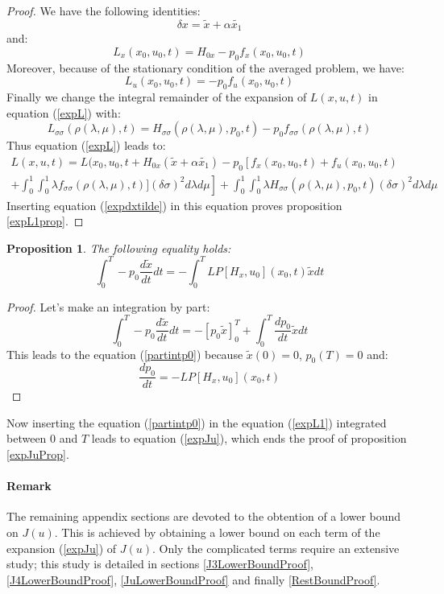 \documentclass[a4paper,10pt]{article}
\newtheorem{proposition}{Proposition}
\begin{document}
\begin{proof}
    We have the following identities:
    \[
        \delta x = \tilde{x} + \alpha \tilde{x_{1}}
    \]
    and:
    \[
      	L_{x}(x_{0},u_{0},t)= H_{0x} - p_{0} f_{x}(x_{0},u_{0},t) 
    \]
    Moreover, because of the stationary condition of the averaged 
    problem, we have:
    \[
      	L_{u}(x_{0},u_{0},t) =  - p_{0} f_{u}(x_{0},u_{0},t) 
    \]
    Finally we change the integral remainder of the expansion of 
    $L(x,u,t)$ in equation (\ref{expL}) with:
    \[
        L_{\sigma \sigma}(\rho(\lambda,\mu),t) 
	= H_{\sigma \sigma}(\rho(\lambda,\mu),p_{0},t)  
	  - p_{0} f_{\sigma \sigma}(\rho(\lambda,\mu),t)
    \]
    Thus equation (\ref{expL}) leads to:
    \begin{align*}
        L(x,u,t) = L(x_{0},u_{0},t + H_{0x} (\tilde{x} +\alpha \tilde{x_{1}}) 
	           - p_{0} \left[f_{x}(x_{0},u_{0},t) + 
		   f_{u}(x_{0},u_{0},t)
		   \right. \\ \left.
		   + \int_{0}^{1} \int_{0}^{1} 
		   \lambda f_{\sigma \sigma}(\rho(\lambda,\mu),t)](\delta \sigma)^{2} d \lambda d \mu\right]
		   + \int_{0}^{1} \int_{0}^{1} 
		   \lambda H_{\sigma \sigma}(\rho(\lambda,\mu),p_{0},t)(\delta \sigma)^{2} d \lambda d \mu
        \label{expL1}
    \end{align*}
Inserting equation (\ref{expdxtilde}) in this equation proves 
proposition \ref{expL1prop}.
\end{proof}
\begin{proposition}
    The following equality holds:
\begin{equation}
            \int_{0}^{T} -p_{0} \frac{d\tilde{x}}{dt}dt = - 
	    \int_{0}^{T} LP[H_{x},u_{0}](x_{0},t) \tilde{x}dt
    \label{partintp0}
\end{equation}
\end{proposition}
\begin{proof}
    Let's make an integration by part:
    \[
        \int_{0}^{T} -p_{0} \frac{d\tilde{x}}{dt} dt
         = - [p_{0}\tilde{x}]_{0}^{T} +  \int_{0}^{T} 
	 \frac{dp_{0}}{dt} \tilde{x} dt
    \]
    This leads to the equation (\ref{partintp0}) because $\tilde{x}(0)=0$, 
    $p_{0}(T)=0$ and:
    \[
        \frac{dp_{0}}{dt} =  - LP[H_{x},u_{0}](x_{0},t)
    \]
\end{proof}
Now inserting the equation (\ref{partintp0}) in the equation 
(\ref{expL1}) integrated between $0$ and $T$ leads to equation 
(\ref{expJu}), which ends the proof of proposition \ref{expJuProp}.

\paragraph{Remark} The remaining appendix sections are devoted to 
the obtention of a lower bound on $J(u)$. This is achieved by 
obtaining a lower bound on each term of the expansion (\ref{expJu}) 
of $J(u)$. Only the complicated terms require an extensive study; 
this study is 
detailed in sections \ref{J3LowerBoundProof}, 
\ref{J4LowerBoundProof},  \ref{JuLowerBoundProof} and finally 
\ref{RestBoundProof}.
\end{document}
